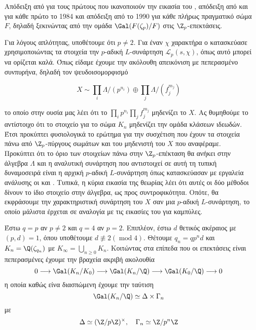 


Απόδειξη από  για τους πρώτους που ικανοποιούν την εικασία του , απόδειξη από  και  για κάθε πρώτο το 1984 και απόδειξη από  το 1990 για κάθε πλήρως πραγματικό σώμα $F$, δηλαδή ξεκινώντας από την ομάδα $\Gal(F(\zeta_p)/F)$ στις $\Z_p$-επεκτάσεις.



Για λόγους απλότητας, υποθέτουμε ότι $p\neq 2$. Για έναν $\chi$ χαρακτήρα  ο  κατασκεύασε χρησιμοποιώντας τα  στοιχεία την $p$-αδική $L$-συνάρτηση $\mathcal{L}_p(s,\chi)$, όπως αυτό μπορεί να ορίζεται καλά. Όπως είδαμε έχουμε την ακόλουθη απεικόνιση με πεπερασμένο συνπυρήνα, δηλαδή τον ψευδοισομορφισμό

$$X \sim \prod\limits_{i} \Lambda / (p^{n_i}) \oplus \prod\limits_{j}\Lambda /(f^{m_j}_j)$$

το οποίο στην ουσία μας λέει ότι το $\prod\limits_{i} p^{n_i} \prod\limits_{j} f^{m_j}_j$ μηδενίζει το $X$. Ας θυμηθούμε το αντίστοιχο ότι το στοιχείο  για το σώμα $K_n$ μηδενίζει την ομάδα κλάσεων ιδεωδών. Έτσι προκύπτει φυσιολογικά το ερώτημα για την συσχέτιση που έχουν τα  στοιχεία πάνω από $\Z_p$-πύργους σωμάτων και του μηδενιστή του $X$ που αναφέραμε. Προκύπτει ότι το όριο των  στοιχείων πάνω στην $\Z_p$-επέκταση θα ανήκει στην  άλγεβρα $\Lambda$ και η αναλυτική συνάρτηση που αντιστοιχεί σε αυτή τη τυπική δυναμοσειρά είναι η αρχική $p$-αδική $L$-συνάρτηση όπως κατασκεύασαν με εργαλεία ανάλυσης οι  και . Τυπικά, η κύρια εικασία της θεωρίας  λέει ότι αυτές οι δύο μέθοδοι δίνουν το ίδιο στοιχείο στην  άλγεβρα, ως προς συντροφικότητα. Οπότε, θα εκφράσουμε την χαρακτηριστική συνάρτηση του $X$ σαν μια $p$-αδική $L$-συνάρτηση, το οποίο μάλιστα έρχεται σε αναλογία με τις εικασίες του  για καμπύλες. 

Έστω $q=p$ αν $p\neq 2$ και $q=4$ αν $p=2$. Επιπλέον, έστω $d$ θετικός ακέραιος με $(p,d)=1$, όπου υποθέτουμε $d\not\equiv 2 (\operatorname{mod}4)$. Θέτουμε $q_n = qp^n d$ και $K_n=\Q(\zeta_{q_n})$ με $K_\infty = \bigcup_{n\geq 0}K_n$. Κοιτώντας στα επίπεδα που οι επεκτάσεις είναι πεπερασμένες έχουμε την βραχεία ακριβή ακολουθία
$$0\longrightarrow \Gal(K_n/K_0) \longrightarrow \Gal(K_n/\Q) \longrightarrow \Gal(K_0/\Q) \longrightarrow 0$$ 
η οποία καθώς είνα διασπώμενη έχουμε την ταύτιση
$$\Gal(K_n/\Q) \simeq \Delta \times \Gamma_n$$ με 
$$\Delta \simeq (\Z/p\Z)^\times, \quad \Gamma_n \simeq \Z/p^n \Z$$

